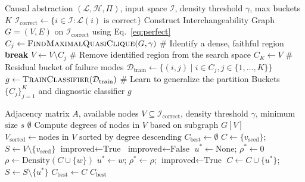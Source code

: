 \begin{algorithm}[ht]
\caption{The Diagnosis Pipeline}
\label{alg:diagnosis}
\begin{algorithmic}[1]
\REQUIRE Causal abstraction $(\mathcal{L}, \mathcal{H}, \Pi)$, input space $\mathcal{I}$, density threshold $\gamma$, max buckets $K$
\STATE $\mathcal{I}_{\mathrm{correct}} \leftarrow \{i \in \mathcal{I} : \mathcal{L}(i) \text{ is correct}\}$
\STATE Construct Interchangeability Graph $G = (V, E)$ on $\mathcal{I}_{\mathrm{correct}}$ using Eq.~\ref{eq:perfect}
    \STATE $C_j \leftarrow \textsc{FindMaximalQuasiClique}(G, \gamma)$ \hfill \# Identify a dense, faithful region
        \STATE \textbf{break}
    \ENDIF
    \STATE $V \leftarrow V \setminus C_j$ \hfill \# Remove identified region from the search space
\ENDFOR
\STATE $C_K \leftarrow V$ \hfill \# Residual bucket of failure modes
\STATE $\mathcal{D}_{\mathrm{train}} \leftarrow \{(i, j) \mid i \in C_j, j \in \{1, \dots, K\}\}$
\STATE $g \leftarrow \textsc{TrainClassifier}(\mathcal{D}_{\mathrm{train}})$ \hfill \# Learn to generalize the partition
\RETURN Buckets $\{C_j\}_{j=1}^K$ and diagnostic classifier $g$
\end{algorithmic}
\end{algorithm}

\begin{algorithm}[ht]
\caption{Multi-Seed Greedy Quasi-Clique Search}
\label{alg:multi_seed_quasi}
\begin{algorithmic}[1]
\REQUIRE Adjacency matrix $A$, available nodes $V \subseteq \mathcal{I}_{\mathrm{correct}}$, density threshold $\gamma$, minimum size $s$
 \RETURN $\emptyset$ \ENDIF
\STATE Compute degrees of nodes in $V$ based on subgraph $G[V]$
\STATE $V_{\mathrm{sorted}} \leftarrow \text{nodes in } V \text{ sorted by degree descending}$
\STATE $C_{\mathrm{best}} \leftarrow \emptyset$
    \STATE $C \leftarrow \{v_{\mathrm{seed}}\}$; $S \leftarrow V \setminus \{v_{\mathrm{seed}}\}$
    \STATE $\text{improved} \leftarrow \text{True}$
        \STATE $\text{improved} \leftarrow \text{False}$
        \STATE $u^* \leftarrow \text{None}$; $\rho^* \leftarrow 0$
            \STATE $\rho \leftarrow \text{Density}(C \cup \{w\})$
            \IF{$\rho \ge \gamma$ \AND $\rho > \rho^*$}
                \STATE $u^* \leftarrow w$; $\rho^* \leftarrow \rho$; $\text{improved} \leftarrow \text{True}$
            \ENDIF
        \ENDFOR
            \STATE $C \leftarrow C \cup \{u^*\}$; $S \leftarrow S \setminus \{u^*\}$
        \ENDIF
    \ENDWHILE
        \STATE $C_{\mathrm{best}} \leftarrow C$
    \ENDIF
\ENDFOR
\RETURN $C_{\mathrm{best}}$
\end{algorithmic}
\end{algorithm}


